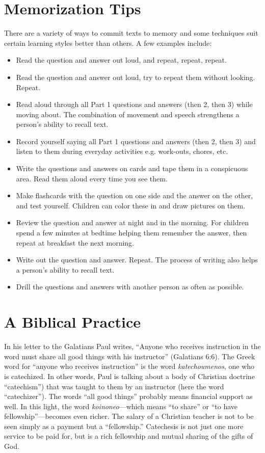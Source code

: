 \documentclass[00-main.tex]{subfiles}
\begin{document}
\section{Memorization Tips}
There are a variety of ways to commit texts to memory and some techniques suit certain learning styles better than others. A few examples include:

\begin{itemize}
	\item Read the question and answer out loud, and repeat, repeat, repeat.
	\item Read the question and answer out loud, try to repeat them without looking. Repeat.
	\item Read aloud through all Part 1 questions and answers (then 2, then 3) while moving about. The combination of movement and speech strengthens a person's ability to recall text.
	\item Record yourself saying all Part 1 questions and answers (then 2, then 3) and listen to them during everyday activities e.g. work-outs, chores, etc.
	\item Write the questions and answers on cards and tape them in a conspicuous area. Read them aloud every time you see them.
	\item Make flashcards with the question on one side and the answer on the other, and test yourself. Children can color these in and draw pictures on them.
	\item Review the question and answer at night and in the morning. For children spend a few minutes at bedtime helping them remember the answer, then repeat at breakfast the next morning.
	\item Write out the question and answer. Repeat. The process of writing also helps a person's ability to recall text.
	\item Drill the questions and answers with another person as often as possible.
\end{itemize}  

\section{A Biblical Practice}
In his letter to the Galatians Paul writes, ``Anyone who receives instruction in the word must share all good things with his instructor'' (Galatians 6:6). The Greek word for ``anyone who receives instruction'' is the word \emph{kate\-chou\-men\-os}, one who is catechized. In other words, Paul is talking about a body of Christian doctrine ``catechism'') that was taught to them by an instructor (here the word ``catechizer''). The words ``all good things'' probably means financial support as well. In this light, the word \emph{koinoneo}\thinspace{}---\thinspace{}which means ``to share'' or ``to have fellowship''\thinspace{}---\thinspace{}becomes even richer. The salary of a Christian teacher is not to be seen simply as a payment but a ``fellowship.'' Catechesis is not just one more service to be paid for, but is a rich fellowship and mutual sharing of the gifts of God.
\end{document}
